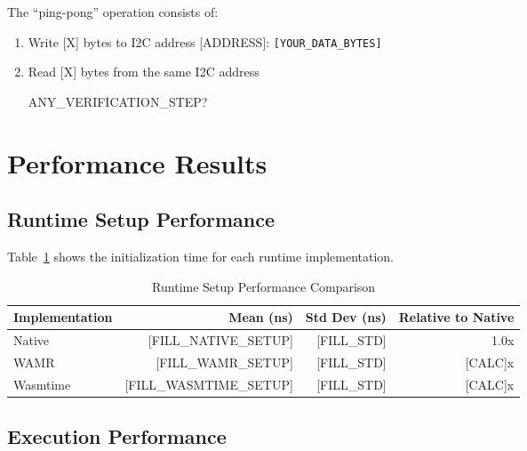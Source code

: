 The ``ping-pong'' operation consists of:
\begin{enumerate}
    \item Write [X] bytes to I2C address [ADDRESS]: \texttt{[YOUR\_DATA\_BYTES]}
    \item Read [X] bytes from the same I2C address
    \item [ANY\_VERIFICATION\_STEP?]
\end{enumerate}

\section{Performance Results}
\label{sec:performance-results}

\subsection{Runtime Setup Performance}
\label{subsec:setup-performance}

Table~\ref{tab:setup-performance} shows the initialization time for each runtime implementation.

\begin{table}[htbp]
\centering
\caption{Runtime Setup Performance Comparison}
\label{tab:setup-performance}
\begin{tabular}{lrrr}
\toprule
\textbf{Implementation} & \textbf{Mean (ns)} & \textbf{Std Dev (ns)} & \textbf{Relative to Native} \\
\midrule
Native        & [FILL\_NATIVE\_SETUP]    & [FILL\_STD]  & 1.0x \\
WAMR          & [FILL\_WAMR\_SETUP]      & [FILL\_STD]  & [CALC]x \\
Wasmtime      & [FILL\_WASMTIME\_SETUP]  & [FILL\_STD]  & [CALC]x \\
\bottomrule
\end{tabular}
\end{table}


\subsection{Execution Performance}
\label{subsec:execution-performance}

